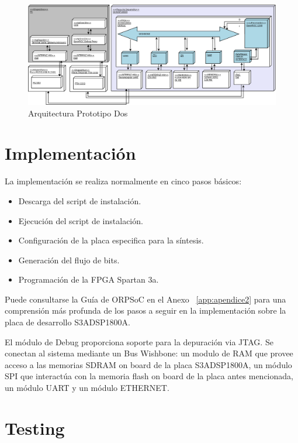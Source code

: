 		\begin{figure}[!h]
 		\begin{center}
  		\includegraphics[width=1\textwidth,keepaspectratio=true]{./images/orpsoc}
  		\caption{Arquitectura Prototipo Dos}
  		\label{fig:orpsoc} 
 		\end{center}
		\end{figure}
	
		\section{Implementación}

		La implementación se realiza normalmente en cinco pasos básicos: 
		\begin {itemize}
		\item Descarga del script de instalación.
		\item Ejecución del script de instalación.
		\item Configuración de la placa especifica para la síntesis.
		\item Generación del flujo de bits.
		\item Programación de la FPGA Spartan 3a.
 		\end {itemize}
 
 Puede consultarse la Guía de ORPSoC en el Anexo ~\ref{app:apendice2} para una comprensión más profunda de los pasos a seguir en la implementación
 sobre la placa de desarrollo S3ADSP1800A.

El módulo de Debug proporciona soporte para la depuración via JTAG. Se conectan al sistema mediante un Bus Wishbone: un modulo de RAM que provee acceso a las memorias SDRAM on board de la placa S3ADSP1800A, un módulo SPI que interactúa con la memoria flash on board de la placa antes mencionada, un módulo UART y un módulo ETHERNET. 
		


\newpage
		\section{Testing}

